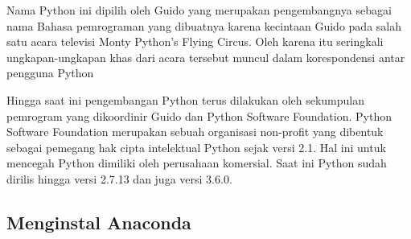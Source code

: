 Nama Python ini dipilih oleh Guido yang merupakan pengembangnya sebagai nama Bahasa pemrograman yang dibuatnya karena kecintaan Guido pada salah satu acara televisi Monty Python’s Flying Circus. Oleh karena itu seringkali ungkapan-ungkapan khas dari acara tersebut muncul dalam korespondensi antar pengguna Python

Hingga saat ini pengembangan Python terus dilakukan oleh sekumpulan pemrogram yang dikoordinir Guido dan Python Software Foundation. Python Software Foundation merupakan sebuah organisasi non-profit yang dibentuk sebagai pemegang hak cipta intelektual Python sejak versi 2.1. Hal ini untuk mencegah Python dimiliki oleh perusahaan komersial. Saat ini Python sudah dirilis hingga versi 2.7.13 dan juga versi 3.6.0.

\subsection{Menginstal Anaconda}
